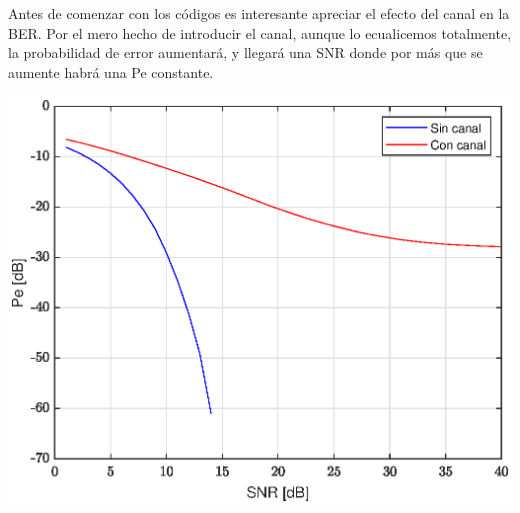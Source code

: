 \documentclass[11pt]{scrartcl} %
\begin{document}
\begin{preview}
Antes de comenzar con los códigos es interesante apreciar el efecto del canal en la BER. Por el mero hecho de introducir el canal, aunque lo ecualicemos totalmente, la probabilidad de error aumentará, y llegará una SNR donde por más que se aumente habrá una Pe constante.

\begin{minipage}{\linewidth}
	\begin{center}
		\includegraphics[width=1\columnwidth,trim={0 0 1cm 0},clip]{../../Matlab/Figures/canalefectoenber.eps} %
	\end{center}
	\label{fig6}
\end{minipage}






\end{preview}
\end{document}
